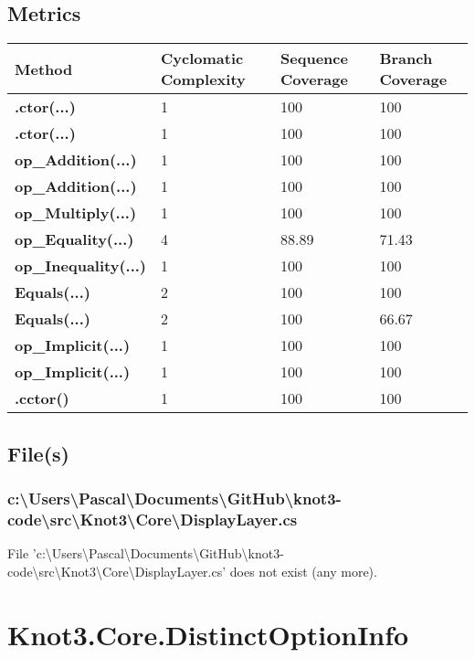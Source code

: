 \documentclass[a4paper,10pt]{article}
\begin{document}
\subsection{Metrics}
\begin{longtable}[l]{|l|l|l|l|}
\hline
\textbf{Method} & \textbf{Cyclomatic Complexity} & \textbf{Sequence Coverage} & \textbf{Branch Coverage}\\
\hline
\textbf{.ctor(...)} & 1 & 100 & 100\\
\hline
\textbf{.ctor(...)} & 1 & 100 & 100\\
\hline
\textbf{op\_Addition(...)} & 1 & 100 & 100\\
\hline
\textbf{op\_Addition(...)} & 1 & 100 & 100\\
\hline
\textbf{op\_Multiply(...)} & 1 & 100 & 100\\
\hline
\textbf{op\_Equality(...)} & 4 & 88.89 & 71.43\\
\hline
\textbf{op\_Inequality(...)} & 1 & 100 & 100\\
\hline
\textbf{Equals(...)} & 2 & 100 & 100\\
\hline
\textbf{Equals(...)} & 2 & 100 & 66.67\\
\hline
\textbf{op\_Implicit(...)} & 1 & 100 & 100\\
\hline
\textbf{op\_Implicit(...)} & 1 & 100 & 100\\
\hline
\textbf{.cctor()} & 1 & 100 & 100\\
\hline
\end{longtable}
\subsection{File(s)}
\subsubsection{c:\textbackslash Users\textbackslash Pascal\textbackslash Documents\textbackslash GitHub\textbackslash knot3-code\textbackslash src\textbackslash Knot3\textbackslash Core\textbackslash DisplayLayer.cs}
 File 'c:\textbackslash Users\textbackslash Pascal\textbackslash Documents\textbackslash GitHub\textbackslash knot3-code\textbackslash src\textbackslash Knot3\textbackslash Core\textbackslash DisplayLayer.cs' does not exist (any more).
\newpage
\section{Knot3.Core.DistinctOptionInfo}
\end{document}
